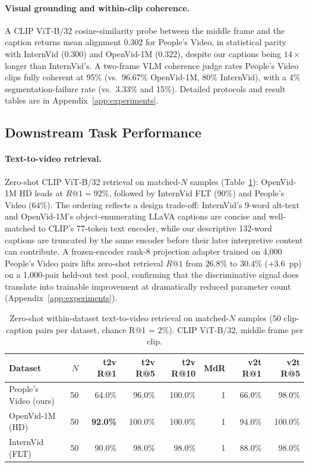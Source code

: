 \documentclass{article}
\begin{document}
\paragraph{Visual grounding and within-clip coherence.}
A CLIP ViT-B/32 cosine-similarity probe between the middle frame and the caption returns mean alignment $0.302$ for People's Video, in statistical parity with InternVid ($0.300$) and OpenVid-1M ($0.322$), despite our captions being $14\times$ longer than InternVid's. A two-frame VLM coherence judge rates People's Video clips fully coherent at 95\% (vs.\ 96.67\% OpenVid-1M, 80\% InternVid), with a 4\% segmentation-failure rate (vs.\ 3.33\% and 15\%). Detailed protocols and result tables are in Appendix~\ref{app:experiments}.

\subsection{Downstream Task Performance}
\label{sec:exp-downstream}

\paragraph{Text-to-video retrieval.}
Zero-shot CLIP ViT-B/32 retrieval on matched-$N$ samples (Table~\ref{tab:retrieval}): OpenVid-1M HD leads at $R@1 = 92\%$, followed by InternVid FLT ($90\%$) and People's Video ($64\%$). The ordering reflects a design trade-off: InternVid's 9-word alt-text and OpenVid-1M's object-enumerating LLaVA captions are concise and well-matched to CLIP's 77-token text encoder, while our descriptive 132-word captions are truncated by the same encoder before their later interpretive content can contribute. A frozen-encoder rank-8 projection adapter trained on 4{,}000 People's Video pairs lifts zero-shot retrieval $R@1$ from $26.8\%$ to $30.4\%$ ($+3.6$~pp) on a 1{,}000-pair held-out test pool, confirming that the discriminative signal does translate into trainable improvement at dramatically reduced parameter count (Appendix~\ref{app:experiments}).

\begin{table}[t]
\centering
\caption{Zero-shot within-dataset text-to-video retrieval on matched-$N$ samples (50 clip-caption pairs per dataset, chance R@1 = 2\%). CLIP ViT-B/32, middle frame per clip.}
\label{tab:retrieval}
\begin{tabular}{lrrrrrrr}
\toprule
Dataset & $N$ & t2v R@1 & t2v R@5 & t2v R@10 & MdR & v2t R@1 & v2t R@5 \\
\midrule
People's Video (ours) & 50 & 64.0\% & 96.0\% & 100.0\% & 1 & 66.0\% & 98.0\% \\
OpenVid-1M (HD)       & 50 & \textbf{92.0\%} & 100.0\% & 100.0\% & 1 & 94.0\% & 100.0\% \\
InternVid (FLT)       & 50 & 90.0\% & 98.0\% & 98.0\% & 1 & 88.0\% & 98.0\% \\
\bottomrule
\end{tabular}
\end{table}
\end{document}
